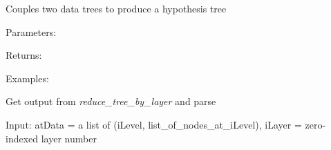 \documentclass[letterpaper,10pt,english]{sphinxmanual}
\begin{document}

\begin{fulllineitems}
\label{index:halla.hierarchy.couple_tree}
Couples two data trees to produce a hypothesis tree

Parameters:

Returns:

Examples:

\end{fulllineitems}


\begin{fulllineitems}
\label{index:halla.hierarchy.get_layer}
Get output from \emph{reduce\_tree\_by\_layer} and parse

Input: atData = a list of (iLevel, list\_of\_nodes\_at\_iLevel), iLayer = zero-indexed layer number

\end{fulllineitems}

\end{document}
